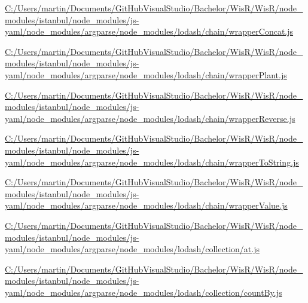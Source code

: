\begin{DoxyCompactItemize}
\item 
\hyperlink{_c_1_2_users_2martin_2_documents_2_git_hub_visual_studio_2_bachelor_2_wis_r_2_wis_r_2node_module462be5b7170d04c472caf7d600739198}{C\+:/\+Users/martin/\+Documents/\+Git\+Hub\+Visual\+Studio/\+Bachelor/\+Wis\+R/\+Wis\+R/node\+\_\+modules/istanbul/node\+\_\+modules/js-\/yaml/node\+\_\+modules/argparse/node\+\_\+modules/lodash/chain/wrapper\+Concat.\+js}
\item 
\hyperlink{_c_1_2_users_2martin_2_documents_2_git_hub_visual_studio_2_bachelor_2_wis_r_2_wis_r_2node_module1da026154b072d08e7a806397c3337fa}{C\+:/\+Users/martin/\+Documents/\+Git\+Hub\+Visual\+Studio/\+Bachelor/\+Wis\+R/\+Wis\+R/node\+\_\+modules/istanbul/node\+\_\+modules/js-\/yaml/node\+\_\+modules/argparse/node\+\_\+modules/lodash/chain/wrapper\+Plant.\+js}
\item 
\hyperlink{_c_1_2_users_2martin_2_documents_2_git_hub_visual_studio_2_bachelor_2_wis_r_2_wis_r_2node_module03abbf41928ce1f85d0119c192718c80}{C\+:/\+Users/martin/\+Documents/\+Git\+Hub\+Visual\+Studio/\+Bachelor/\+Wis\+R/\+Wis\+R/node\+\_\+modules/istanbul/node\+\_\+modules/js-\/yaml/node\+\_\+modules/argparse/node\+\_\+modules/lodash/chain/wrapper\+Reverse.\+js}
\item 
\hyperlink{_c_1_2_users_2martin_2_documents_2_git_hub_visual_studio_2_bachelor_2_wis_r_2_wis_r_2node_module2017938a804ec221f7e1f325ebc9ba9f}{C\+:/\+Users/martin/\+Documents/\+Git\+Hub\+Visual\+Studio/\+Bachelor/\+Wis\+R/\+Wis\+R/node\+\_\+modules/istanbul/node\+\_\+modules/js-\/yaml/node\+\_\+modules/argparse/node\+\_\+modules/lodash/chain/wrapper\+To\+String.\+js}
\item 
\hyperlink{_c_1_2_users_2martin_2_documents_2_git_hub_visual_studio_2_bachelor_2_wis_r_2_wis_r_2node_module03b60d42ae33399a929616bf067709fd}{C\+:/\+Users/martin/\+Documents/\+Git\+Hub\+Visual\+Studio/\+Bachelor/\+Wis\+R/\+Wis\+R/node\+\_\+modules/istanbul/node\+\_\+modules/js-\/yaml/node\+\_\+modules/argparse/node\+\_\+modules/lodash/chain/wrapper\+Value.\+js}
\item 
\hyperlink{_c_1_2_users_2martin_2_documents_2_git_hub_visual_studio_2_bachelor_2_wis_r_2_wis_r_2node_module6de1bde3dbafdb29de256423e58a698b}{C\+:/\+Users/martin/\+Documents/\+Git\+Hub\+Visual\+Studio/\+Bachelor/\+Wis\+R/\+Wis\+R/node\+\_\+modules/istanbul/node\+\_\+modules/js-\/yaml/node\+\_\+modules/argparse/node\+\_\+modules/lodash/collection/at.\+js}
\item 
\hyperlink{_c_1_2_users_2martin_2_documents_2_git_hub_visual_studio_2_bachelor_2_wis_r_2_wis_r_2node_moduleb64750884b26bd9462a60018f29d0998}{C\+:/\+Users/martin/\+Documents/\+Git\+Hub\+Visual\+Studio/\+Bachelor/\+Wis\+R/\+Wis\+R/node\+\_\+modules/istanbul/node\+\_\+modules/js-\/yaml/node\+\_\+modules/argparse/node\+\_\+modules/lodash/collection/count\+By.\+js}

\end{DoxyCompactItemize}

